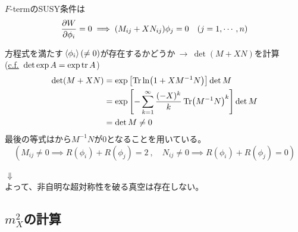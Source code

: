 \documentclass[
  unicode,a4paper,9pt,
  xcolor = {dvipsnames,svgnames},
  hyperref ={colorlinks=true,citecolor=Navy,linkcolor=NavyBlue,urlcolor=purple},
  ja=standard,lualatex
]{beamer}
\begin{document}
\begin{frame}

  $F$-termのSUSY条件は
  \begin{equation}
    \pdv{W}{\phi_{i}}
    =
    0
    \implies
    (M_{ij}+XN_{ij})\phi_{j}
    =
    0
    \quad
    (j=1,\cdots,n)
    \nonumber
  \end{equation}

  方程式を満たす$\ev*{\phi_{i}}(\neq 0)$が存在するかどうか$\ \rightarrow\ \det(M+XN)$を計算\\
  (\uline{c.f.}\ $\det\exp A=\exp\tr A$)
  \begin{align}
    \det (M+XN)
     & =
    \exp\left[ \Tr\ln (1+XM^{-1}N) \right]\det M
    \nonumber
    \\
     & =
    \exp\left[
      -\sum_{k=1}^{\infty}\frac{(-X)^{k}}{k}\Tr(M^{-1}N)^{k}
      \right]
    \det M
    \nonumber
    \\
     &
    =
    \det M\neq 0
    \nonumber
  \end{align}
  最後の等式はから$M^{-1}N$が$0$となることを用いている。
  \begin{equation}
    \left(
    M_{ij}\neq 0
    \implies
    R(\phi_{i})+R(\phi_{j})=2
    \ ,\quad
    N_{ij}\neq 0
    \implies
    R(\phi_{i})+R(\phi_{j})=0
    \right)
    \nonumber
  \end{equation}

  \begin{center}
    {\Huge $\Downarrow$}\\
    よって、非自明な超対称性を破る真空は存在しない。
  \end{center}

\end{frame}


\subsection{\texorpdfstring{$m_{X}^2$}{mX2}の計算}
\end{document}
